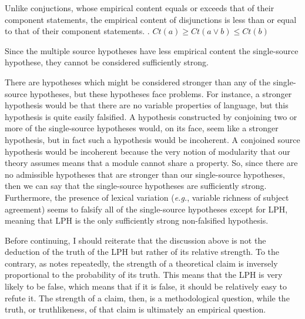\documentclass[MilwayThesis]{subfiles}
\begin{document}
Unlike conjuctions, whose empirical content equals or exceeds that of their component statements, the empirical content of disjunctions is less than or equal to that of their component statements.
\ex. $Ct(a) \geq Ct(a\vee b) \leq Ct(b)$

Since the multiple source hypotheses have less empirical content the single-source hypothese, they cannot be considered sufficiently strong.

There are hypotheses which might be considered stronger than any of the single-source hypotheses, but these hypotheses face problems.
For instance, a stronger hypothesis would be that there are no variable properties of language, but this hypothesis is quite easily falsified.
A hypothesis constructed by conjoining two or more of the single-source hypotheses would, on its face, seem like a stronger hypothesis, but in fact such a hypothesis would be incoherent.
A conjoined source hypothesis would be incoherent because the very notion of modularity that our theory assumes means that a module cannot share a property.
So, since there are no admissible hypotheses that are stronger than our single-source hypotheses, then we can say that the single-source hypotheses are sufficiently strong.
Furthermore, the presence of lexical variation (\textit{e.g.}, variable richness of subject agreement) seems to falsify all of the single-source hypotheses except for LPH, meaning that LPH is the only sufficiently strong non-falsified hypothesis.

Before continuing, I should reiterate that the discussion above is not the deduction of the truth of the LPH but rather of its relative strength.
To the contrary, as \textcite{popper2014conjectures} notes repeatedly, the strength of a theoretical claim is inversely proportional to the probability of its truth.
This means that the LPH is very likely to be false, which means that if it is false, it should be relatively easy to refute it.
The strength of a claim, then, is a methodological question, while the truth, or truthlikeness, of that claim is ultimately an empirical question.
\end{document}

